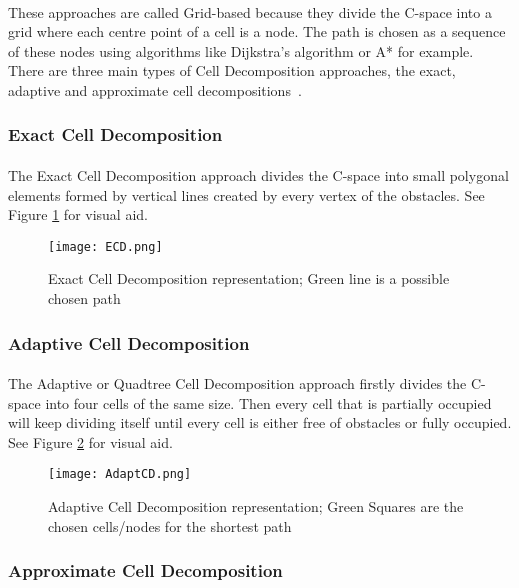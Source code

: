 \paragraph{}These approaches are called Grid-based because they divide the C-space into a grid where each centre point of a cell is a node. 
The path is chosen as a sequence of these  nodes using algorithms like Dijkstra’s algorithm or A* for example.
There are three main types of Cell Decomposition approaches, the exact, adaptive and approximate cell decompositions~\cite{PATLE2019582}. 
\subsubsection{Exact Cell Decomposition}
\label{subsubsec:ECD}
\paragraph{}The Exact Cell Decomposition approach divides the C-space into small polygonal elements formed by vertical lines created by every vertex of the obstacles. 
See Figure \ref{fig:ExactCellDecomposition} for visual aid.
\begin{figure}[H]
    \centering
    \texttt{[image: ECD.png]}
    \caption{Exact Cell Decomposition representation; Green line is a possible chosen path}
    \label{fig:ExactCellDecomposition}
\end{figure}
\subsubsection{Adaptive Cell Decomposition}
\label{subsubsec:AdaptCD}
\paragraph{}The Adaptive or Quadtree Cell Decomposition approach firstly divides the C-space into four cells of the same size. Then every cell that is partially occupied will 
keep dividing itself until every cell is either free of obstacles or fully occupied. See Figure \ref{fig:AdaptiveCellDecomposition} for visual aid.
\begin{figure}[H]
    \centering
    \texttt{[image: AdaptCD.png]}
    \caption{Adaptive Cell Decomposition representation; Green Squares are the chosen cells/nodes for the shortest path}
    \label{fig:AdaptiveCellDecomposition}
\end{figure}
\subsubsection{Approximate Cell Decomposition}
\label{subsubsec:ApproxCD}
